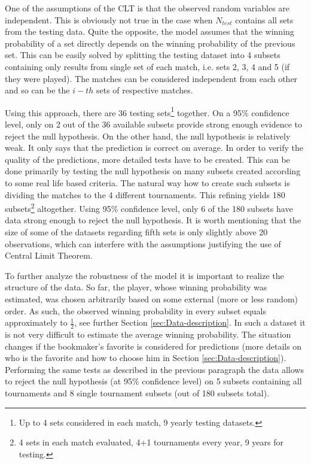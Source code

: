 \documentclass{easychair}
\begin{document}
One of the assumptions of the CLT is that the observed random variables
are independent. This is obviously not true in the case when $N_{test}$
contains all sets from the testing data. Quite the opposite, the model
assumes that the winning probability of a set directly depends on
the winning probability of the previous set. This can be easily solved
by splitting the testing dataset into 4 subsets containing only results
from single set of each match, i.e. sets 2, 3, 4 and 5 (if they were
played). The matches can be considered independent from each other
and so can be the $i-th$ sets of respective matches.

Using this approach, there are 36 testing sets\footnote{Up to 4 sets considered in each match, 9 yearly testing datasets.}
together. On a 95\% confidence level, only on 2 out of the 36 available
subsets provide strong enough evidence to reject the null hypothesis.
On the other hand, the null hypothesis is relatively weak. It only
says that the prediction is correct on average. In order to verify
the quality of the predictions, more detailed tests have to be created.
This can be done primarily by testing the null hypothesis on many
subsets created according to some real life based criteria. The natural
way how to create such subsets is dividing the matches to the 4 different
tournaments. This refining yields 180 subsets\footnote{4 sets in each match evaluated, 4+1 tournaments every year, 9 years
for testing.} altogether. Using 95\% confidence level, only 6 of the 180 subsets
have data strong enough to reject the null hypothesis. It is worth
mentioning that the size of some of the datasets regarding fifth sets
is only slightly above 20 observations, which can interfere with the
assumptions justifying the use of Central Limit Theorem.

To further analyze the robustness of the model it is important to
realize the structure of the data. So far, the player, whose winning
probability was estimated, was chosen arbitrarily based on some external
(more or less random) order. As such, the observed winning probability
in every subset equals approximately to $\frac{1}{2}$, see further
Section \ref{sec:Data-description}. In such a dataset it is not very
difficult to estimate the average winning probability. The situation
changes if the bookmaker's favorite is considered for predictions
(more details on who is the favorite and how to choose him in Section
\ref{sec:Data-description}). Performing the same tests as described
in the previous paragraph the data allows to reject the null hypothesis
(at 95\% confidence level) on 5 subsets containing all tournaments
and 8 single tournament subsets (out of 180 subsets total).
\end{document}
